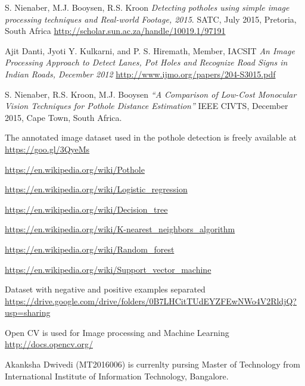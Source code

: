 \documentclass[journal]{IEEEtran}
\begin{document}
\begin{thebibliography}{1}

S. Nienaber, M.J. Booysen, R.S. Kroon
\textit{Detecting potholes using simple image processing techniques and Real-world Footage, 2015}. 
SATC, July 2015, Pretoria, South Africa
\url{http://scholar.sun.ac.za/handle/10019.1/97191}
 
Ajit Danti, Jyoti Y. Kulkarni, and P. S. Hiremath, Member, IACSIT
\textit{An Image Processing Approach to Detect Lanes, Pot Holes and Recognize Road Signs in Indian Roads, December 2012}
\url{http://www.ijmo.org/papers/204-S3015.pdf}

S. Nienaber, R.S. Kroon, M.J. Booysen  
\textit{“A Comparison of Low-Cost Monocular Vision Techniques for Pothole Distance Estimation”}
IEEE CIVTS, December 2015, Cape Town, South Africa.
 
The annotated image dataset used in the pothole detection is freely available at
\url{https://goo.gl/3QyeMs}

\url{https://en.wikipedia.org/wiki/Pothole}

\url{https://en.wikipedia.org/wiki/Logistic_regression}

\url{https://en.wikipedia.org/wiki/Decision_tree}

\url{https://en.wikipedia.org/wiki/K-nearest_neighbors_algorithm}

\url{https://en.wikipedia.org/wiki/Random_forest}

\url{https://en.wikipedia.org/wiki/Support_vector_machine}

Dataset with negative and positive examples separated
\url{https://drive.google.com/drive/folders/0B7LHCitTUdEYZFEwNWo4V2RldjQ?usp=sharing}

Open CV is used for Image processing and Machine Learning
\url{http://docs.opencv.org/}

\end{thebibliography}

\begin{IEEEbiography}{Akanksha Dwivedi}
(MT2016006) is currenlty pursing Master of Technology from International Institute of Information Technology, Bangalore. 
\end{IEEEbiography}
\end{document}

